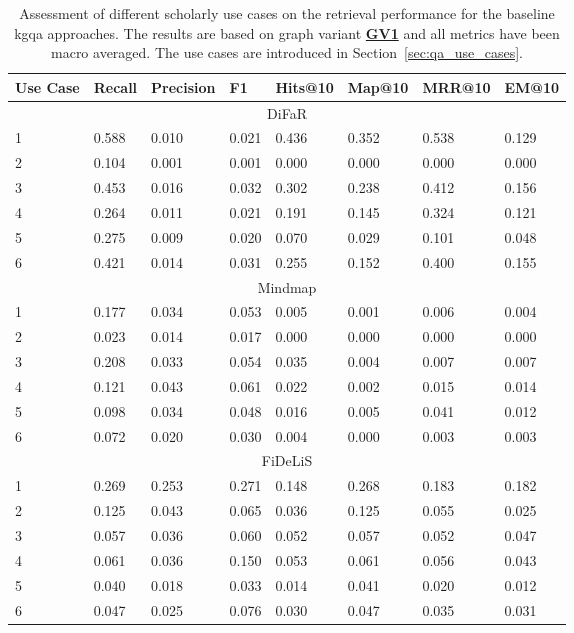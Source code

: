 \begin{table}[H]
\centering
\begin{tabular}{@{}llllllll@{}}
\toprule
Use Case & Recall & Precision & F1 & Hits@10 & Map@10 & MRR@10 & EM@10 \\ 
\midrule
\multicolumn{8}{c}{DiFaR} \\
\midrule
1 & 0.588 & 0.010 & 0.021 & 0.436 & 0.352 & 0.538 & 0.129 \\ 
2 & 0.104 & 0.001 & 0.001 & 0.000 & 0.000 & 0.000 & 0.000 \\ 
3 & 0.453 & 0.016 & 0.032 & 0.302 & 0.238 & 0.412 & 0.156 \\ 
4 & 0.264 & 0.011 & 0.021 & 0.191 & 0.145 & 0.324 & 0.121 \\ 
5 & 0.275 & 0.009 & 0.020 & 0.070 & 0.029 & 0.101 & 0.048 \\ 
6 & 0.421 & 0.014 & 0.031 & 0.255 & 0.152 & 0.400 & 0.155 \\ 
\midrule
\multicolumn{8}{c}{Mindmap} \\
\midrule
1 & 0.177 & 0.034 & 0.053 & 0.005 & 0.001 & 0.006 & 0.004 \\ 
2 & 0.023 & 0.014 & 0.017 & 0.000 & 0.000 & 0.000 & 0.000 \\ 
3 & 0.208 & 0.033 & 0.054 & 0.035 & 0.004 & 0.007 & 0.007 \\ 
4 & 0.121 & 0.043 & 0.061 & 0.022 & 0.002 & 0.015 & 0.014 \\ 
5 & 0.098 & 0.034 & 0.048 & 0.016 & 0.005 & 0.041 & 0.012 \\ 
6 & 0.072 & 0.020 & 0.030 & 0.004 & 0.000 & 0.003 & 0.003 \\ 
\midrule
\multicolumn{8}{c}{FiDeLiS} \\
\midrule
1 & 0.269 & 0.253 & 0.271 & 0.148 & 0.268 & 0.183 & 0.182 \\ 
2 & 0.125 & 0.043 & 0.065 & 0.036 & 0.125 & 0.055 & 0.025 \\ 
3 & 0.057 & 0.036 & 0.060 & 0.052 & 0.057 & 0.052 & 0.047 \\ 
4 & 0.061 & 0.036 & 0.150 & 0.053 & 0.061 & 0.056 & 0.043 \\ 
5 & 0.040 & 0.018 & 0.033 & 0.014 & 0.041 & 0.020 & 0.012 \\ 
6 & 0.047 & 0.025 & 0.076 & 0.030 & 0.047 & 0.035 & 0.031 \\ 
\bottomrule
\end{tabular}%
\caption[Baseline Performance by Use Case]{Assessment of different scholarly use cases on the retrieval performance for the baseline \gls{kgqa} approaches. The results are based on graph variant \hyperref[enum:gv1]{\textbf{GV1}} and all metrics have been macro averaged. The use cases are introduced in Section~\ref{sec:qa_use_cases}.}
\label{tab:baseline_performance_use_case}
\end{table}



